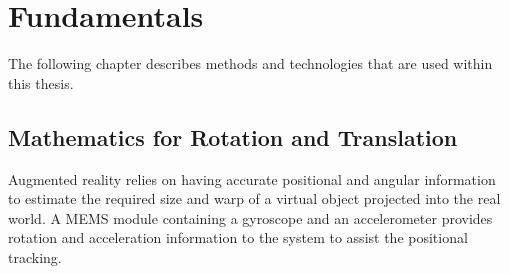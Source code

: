 \chapter{Fundamentals}
\label{sec:Fundamentals}
The following chapter describes methods and technologies that are used within this thesis.
\section{Mathematics for Rotation and Translation}
\label{sec:LinAlgRotation}
Augmented reality relies on having accurate positional and angular information to estimate the required size and warp of a virtual object projected into the real world. A MEMS module containing a gyroscope and an accelerometer provides rotation and acceleration information to the system to assist the positional tracking. 

